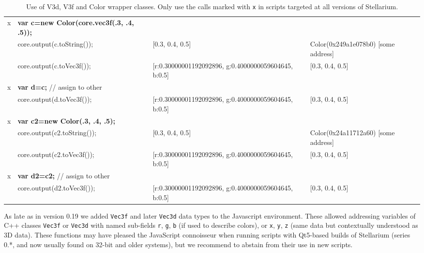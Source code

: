 \begin{table}
{\begin{tabular}{rlll}
x&\textbf{var c=new Color(core.vec3f(.3, .4, .5));}      &                                                              &                                          \\
 &core.output(c.toString());                    &  [0.3, 0.4, 0.5]                                                      &  Color(0x249a1e078b0) [some address]     \\
 &core.output(c.toVec3f());                     &  [r:0.30000001192092896, g:0.4000000059604645, b:0.5]                 &  [0.3, 0.4, 0.5]                         \\
x&\textbf{var d=c;} // assign to other          &                                                                       &                                          \\
 &core.output(d.toVec3f());                     &  [r:0.30000001192092896, g:0.4000000059604645, b:0.5]                 &  [0.3, 0.4, 0.5]                         \\\hline
x&\textbf{var c2=new Color(.3, .4, .5);}        &                                                                       &                                          \\
 &core.output(c2.toString());                   &  [0.3, 0.4, 0.5]                                                      &  Color(0x24a11712a60) [some address]     \\
 &core.output(c2.toVec3f());                    &  [r:0.30000001192092896, g:0.4000000059604645, b:0.5]                 &  [0.3, 0.4, 0.5]                         \\
x&\textbf{var d2=c2;} // assign to other        &                                                                       &                                          \\
 &core.output(d2.toVec3f());                    &  [r:0.30000001192092896, g:0.4000000059604645, b:0.5]                 &  [0.3, 0.4, 0.5]                                            
\end{tabular}}
\caption{Use of V3d, V3f and Color wrapper classes. Only use the calls marked with \texttt{x} in scripts targeted at all versions of Stellarium.}
\label{tab:scripting:Vec3f}
\end{table}



As late as in version 0.19 we added \texttt{Vec3f} and later \texttt{Vec3d} data types to the Javascript environment. 
These allowed addressing variables of C++ classes \texttt{Vec3f} or \texttt{Vec3d} with named sub-fields \texttt{r}, \texttt{g}, \texttt{b} 
(if used to describe colors), or \texttt{x}, \texttt{y}, \texttt{z} (same data but contextually understood as 3D data).
These functions may have pleased the JavaScript connoisseur when running scripts with Qt5-based builds of 
Stellarium (series 0.*, and now usually found on 32-bit and older systems), but we recommend to abstain from their use in new scripts.

